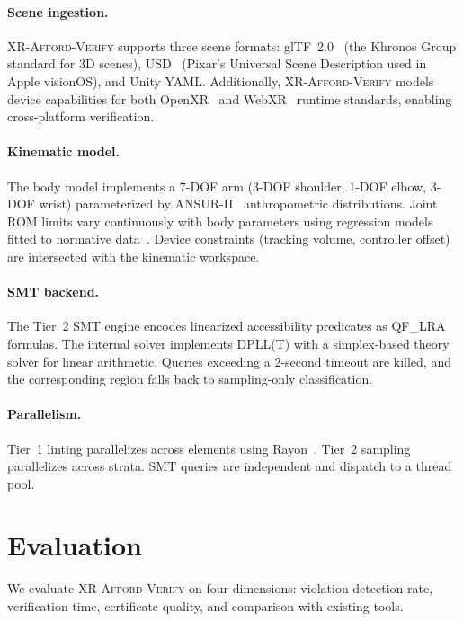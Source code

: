 \documentclass[11pt,letterpaper]{article}
\newcommand{\tool}{\textsc{XR-Afford-Verify}}
\begin{document}
\paragraph{Scene ingestion.}
\tool{} supports three scene formats: glTF~2.0~\cite{gltf} (the Khronos Group standard for 3D scenes), USD~\cite{usd} (Pixar's Universal Scene Description used in Apple visionOS), and Unity YAML.
Additionally, \tool{} models device capabilities for both OpenXR~\cite{openxr} and WebXR~\cite{w3c-webxr} runtime standards, enabling cross-platform verification.

\paragraph{Kinematic model.}
The body model implements a 7-DOF arm (3-DOF shoulder, 1-DOF elbow, 3-DOF wrist) parameterized by ANSUR-II~\cite{ansur2014} anthropometric distributions.
Joint ROM limits vary continuously with body parameters using regression models fitted to normative data~\cite{boone1979}.
Device constraints (tracking volume, controller offset) are intersected with the kinematic workspace.

\paragraph{SMT backend.}
The Tier~2 SMT engine encodes linearized accessibility predicates as QF\_LRA formulas.
The internal solver implements DPLL(T) with a simplex-based theory solver for linear arithmetic.
Queries exceeding a 2-second timeout are killed, and the corresponding region falls back to sampling-only classification.

\paragraph{Parallelism.}
Tier~1 linting parallelizes across elements using Rayon~\cite{rayon}.
Tier~2 sampling parallelizes across strata.
SMT queries are independent and dispatch to a thread pool.

\section{Evaluation}
\label{sec:eval}

We evaluate \tool{} on four dimensions: violation detection rate, verification time, certificate quality, and comparison with existing tools.
\end{document}
